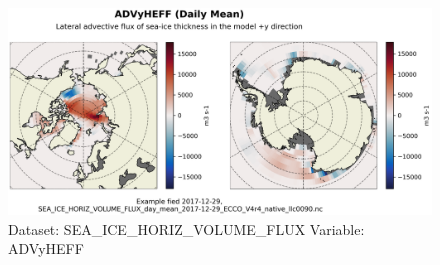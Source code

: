 \begin{figure}[H]
\centering
\includegraphics[width=\textwidth]{../images/plots/native_plots/Sea-Ice_and_Snow_Horizontal_Volume_Fluxes/ADVyHEFF.png}
\caption{Dataset: SEA\_ICE\_HORIZ\_VOLUME\_FLUX Variable: ADVyHEFF}
\label{tab:table-SEA_ICE_HORIZ_VOLUME_FLUX_ADVyHEFF-Plot}
\end{figure}
\pagebreak
